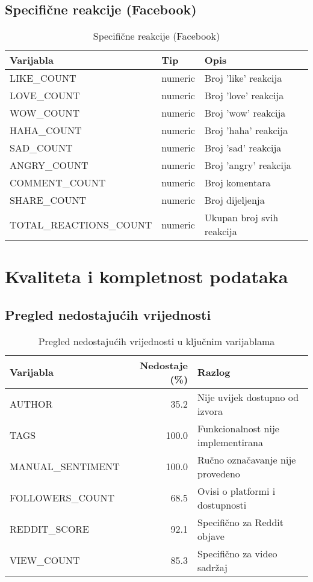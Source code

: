 \documentclass[
]{article}
\begin{document}
\subsection{Specifične reakcije
(Facebook)}\label{specifiux10dne-reakcije-facebook}

\begin{longtable}[t]{lll}
\caption{\label{tab:facebook-vars}Specifične reakcije (Facebook)}\\
\toprule
Varijabla & Tip & Opis\\
\midrule
LIKE\_COUNT & numeric & Broj 'like' reakcija\\
LOVE\_COUNT & numeric & Broj 'love' reakcija\\
WOW\_COUNT & numeric & Broj 'wow' reakcija\\
HAHA\_COUNT & numeric & Broj 'haha' reakcija\\
SAD\_COUNT & numeric & Broj 'sad' reakcija\\
\addlinespace
ANGRY\_COUNT & numeric & Broj 'angry' reakcija\\
COMMENT\_COUNT & numeric & Broj komentara\\
SHARE\_COUNT & numeric & Broj dijeljenja\\
TOTAL\_REACTIONS\_COUNT & numeric & Ukupan broj svih reakcija\\
\bottomrule
\end{longtable}

\section{Kvaliteta i kompletnost
podataka}\label{kvaliteta-i-kompletnost-podataka}

\subsection{Pregled nedostajućih
vrijednosti}\label{pregled-nedostajuux107ih-vrijednosti}

\begin{longtable}[t]{lrl}
\caption{\label{tab:missing-data}Pregled nedostajućih vrijednosti u ključnim varijablama}\\
\toprule
Varijabla & Nedostaje (\%) & Razlog\\
\midrule
AUTHOR & 35.2 & Nije uvijek dostupno od izvora\\
TAGS & 100.0 & Funkcionalnost nije implementirana\\
MANUAL\_SENTIMENT & 100.0 & Ručno označavanje nije provedeno\\
FOLLOWERS\_COUNT & 68.5 & Ovisi o platformi i dostupnosti\\
REDDIT\_SCORE & 92.1 & Specifično za Reddit objave\\
\addlinespace
VIEW\_COUNT & 85.3 & Specifično za video sadržaj\\
\bottomrule
\end{longtable}
\end{document}
